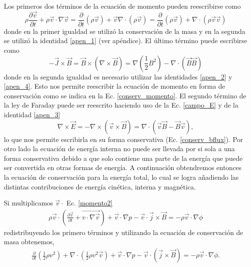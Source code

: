 \documentclass[a4paper,11pt]{report}
\begin{document}
Los primeros dos términos de la ecuación de momento pueden reescribirse como
\begin{equation}
  \rho \frac{\partial\vec{v}}{\partial t} + \rho \vec{v} \cdot \nabla \vec{v} = 
  \frac{\partial}{\partial t}(\rho \vec{v}) + \vec{v} \nabla \cdot(\rho \vec{v})=
  \frac{\partial}{\partial t} (\rho \vec{v}) + \nabla \cdot (\rho \vec{v} \vec{v})
\end{equation}
donde en la primer igualdad se utilizó la conservación de la masa y en la segunda se utilizó la identidad \ref{apen_1} (ver apéndice). El último término puede escribirse como
\begin{equation}
  -\vec{J} \times \vec{B} = \vec{B} \times (\nabla \times \vec{B}) = \nabla (\frac{1}{2}B^2)  - \nabla \cdot (\vec{B}\vec{B}) 
\end{equation}
donde en la segunda igualdad es necesario utilizar las identidades \ref{apen_2} y \ref{apen_4}. Esto nos permite reescribir la ecuación de momento en forma de conservación como se indica en la Ec. \ref{conserv_momento}. El segundo término de la ley de Faraday puede ser reescrito haciendo uso de la Ec. \ref{campo_E} y de la identidad \ref{apen_3} 
\begin{equation}
  \nabla \times \vec{E} = - \nabla \times (\vec{v} \times \vec{B})= \nabla \cdot (\vec{v}\vec{B} -\vec{B}\vec{v} ),
\end{equation}  
lo que nos permite escribirla en su forma conservativa (Ec. \ref{conserv_bflux}).
Por otro lado la ecuación de energía interna no puede ser llevada por si sola a una forma conservativa debido a que solo contiene una parte de la energía que puede ser convertida en otras formas de energía. A continuación obtendremos entonces la ecuación de conservación para la energía total, lo cual se logra añadiendo las distintas contribuciones de energía cinética, interna y magnética.

Si multiplicamos $\vec{v} \cdot$  Ec. \ref{momento2} 
\begin{eqnarray}
\rho \vec{v}\cdot (\frac{\partial \vec{v}}{\partial t}+\vec{v \cdot \nabla \vec{v}})+\vec{v} \cdot \nabla p -\vec{v}\cdot \vec{j}\times \vec{B}= - \rho \vec{v} \cdot \nabla \phi
\end{eqnarray}
redistribuyendo los primero términos y utilizando la ecuación de conservación de masa obtenemos,
\begin{eqnarray}
  \frac{\partial}{\partial t} (\frac{1}{2}\rho v^2) + \nabla \cdot  (\frac{1}{2}\rho v^2 \vec{v}) +\vec{v} \cdot \nabla p - \vec{v} \cdot (\vec{j} \times \vec{B}) = - \rho \vec{v} \cdot \nabla \phi.
\end{eqnarray}
\end{document}
